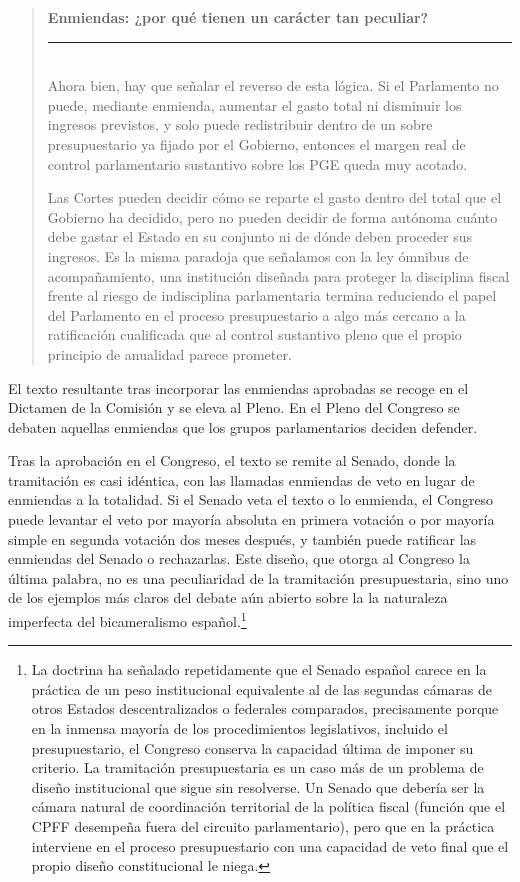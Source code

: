 \documentclass[10pt,a4paper]{article}
\newenvironment{specialblock}[1]{%
      \begin{quote} %
      \small %
      \noindent\textbf{#1}\\[-0.3em] %
      \rule{\linewidth}{0.4pt}\\[0.6em]}{
      \end{quote}}
\begin{document}
\begin{specialblock}{\textbf{Enmiendas:} ¿por qué tienen un carácter tan peculiar?}
    Ahora bien, hay que señalar el reverso de esta lógica. Si el Parlamento no puede, mediante enmienda, aumentar el gasto total ni disminuir los ingresos previstos, y solo puede redistribuir dentro de un sobre presupuestario ya fijado por el Gobierno, entonces el margen real de control parlamentario sustantivo sobre los PGE queda muy acotado. 
    
    Las Cortes pueden decidir cómo se reparte el gasto dentro del total que el Gobierno ha decidido, pero no pueden decidir de forma autónoma cuánto debe gastar el Estado en su conjunto ni de dónde deben proceder sus ingresos. Es la misma paradoja que señalamos con la ley ómnibus de acompañamiento, una institución diseñada para proteger la disciplina fiscal frente al riesgo de indisciplina parlamentaria termina reduciendo el papel del Parlamento en el proceso presupuestario a algo más cercano a la ratificación cualificada que al control sustantivo pleno que el propio principio de anualidad parece prometer.
\end{specialblock}

El texto resultante tras incorporar las enmiendas aprobadas se recoge en el Dictamen de la Comisión y se eleva al Pleno. En el Pleno del Congreso se debaten aquellas enmiendas que los grupos parlamentarios deciden defender. 

Tras la aprobación en el Congreso, el texto se remite al Senado, donde la tramitación es casi idéntica, con las llamadas enmiendas de veto en lugar de enmiendas a la totalidad. Si el Senado veta el texto o lo enmienda, el Congreso puede levantar el veto por mayoría absoluta en primera votación o por mayoría simple en segunda votación dos meses después, y también puede ratificar las enmiendas del Senado o rechazarlas. Este diseño, que otorga al Congreso la última palabra, no es una peculiaridad de la tramitación presupuestaria, sino uno de los ejemplos más claros del debate aún abierto sobre la la naturaleza imperfecta del bicameralismo español.\footnote{%
    La doctrina ha señalado repetidamente que el Senado español carece en la práctica de un peso institucional equivalente al de las segundas cámaras de otros Estados descentralizados o federales comparados, precisamente porque en la inmensa mayoría de los procedimientos legislativos, incluido el presupuestario, el Congreso conserva la capacidad última de imponer su criterio. La tramitación presupuestaria es un caso más de un problema de diseño institucional que sigue sin resolverse. Un Senado que debería ser la cámara natural de coordinación territorial de la política fiscal (función que el CPFF desempeña fuera del circuito parlamentario), pero que en la práctica interviene en el proceso presupuestario con una capacidad de veto final que el propio diseño constitucional le niega.
}
\end{document}
